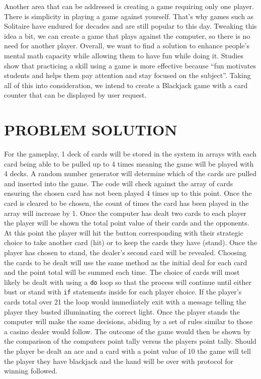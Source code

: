 \documentclass[12pt]{article}
\begin{document}
Another area that can be addressed is creating a game requiring only one player. There is simplicity in playing a game against yourself. That's why games such as Solitaire have endured for decades and are still popular to this day. Tweaking this idea a bit, we can create a game that plays against the computer, so there is no need for another player. 
Overall, we want to find a solution to enhance people's mental math capacity while allowing them to have fun while doing it. Studies show that practicing a skill using a game is more effective because “fun motivates students and helps them pay attention and stay focused on the subject”\cite{games_2018}. Taking all of this into consideration, we intend to create a Blackjack game with a card counter that can be displayed by user request.

\section{PROBLEM SOLUTION}
For the gameplay, 1 deck of cards will be stored in the system in arrays with each card being able to be pulled up to 4 times meaning the game will be played with 4 decks. A random number generator will determine which of the cards are pulled and inserted into the game. The code will check against the array of cards ensuring the chosen card has not been played 4 times up to this point. Once the card is cleared to be chosen, the count of times the card has been played in the array will increase by 1. Once the computer has dealt two cards to each player the player will be shown the total point value of their cards and the opponents. At this point the player will hit the button corresponding with their strategic choice to take another card (hit) or to keep the cards they have (stand). Once the player has chosen to stand, the dealer’s second card will be revealed. Choosing the cards to be dealt will use the same method as the initial deal for each card and the point total will be summed each time. The choice of cards will most likely be dealt with using a \texttt{do} loop so that the process will continue until either bust or stand with \texttt{if} statements inside for each player choice. If the player’s cards total over 21 the loop would immediately exit with a message telling the player they busted illuminating the correct light. Once the player stands the computer will make the same decisions, abiding by a set of rules similar to those a casino dealer would follow. The outcome of the game would then be shown by the comparison of the computers point tally versus the players point tally. Should the player be dealt an ace and a card with a point value of 10 the game will tell the player they have blackjack and the hand will be over with protocol for winning followed.
\end{document}
